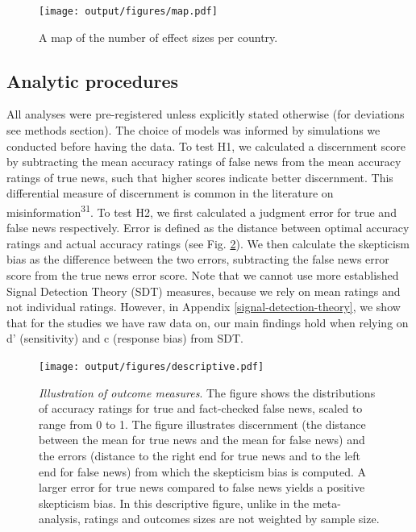 \documentclass[
  man]{apa6}
\begin{document}
\begin{figure}
\centering
\texttt{[image: output/figures/map.pdf]}
\caption{\label{fig:map}A map of the number of effect sizes per country.}
\end{figure}

\subsection{Analytic procedures}\label{analytic-procedures}

All analyses were pre-registered unless explicitly stated otherwise (for deviations see methods section). The choice of models was informed by simulations we conducted before having the data. To test H1, we calculated a discernment score by subtracting the mean accuracy ratings of false news from the mean accuracy ratings of true news, such that higher scores indicate better discernment. This differential measure of discernment is common in the literature on misinformation\textsuperscript{31}. To test H2, we first calculated a judgment error for true and false news respectively. Error is defined as the distance between optimal accuracy ratings and actual accuracy ratings (see Fig. \ref{fig:descriptive}). We then calculate the skepticism bias as the difference between the two errors, subtracting the false news error score from the true news error score. Note that we cannot use more established Signal Detection Theory (SDT) measures, because we rely on mean ratings and not individual ratings. However, in Appendix \ref{signal-detection-theory}, we show that for the studies we have raw data on, our main findings hold when relying on d' (sensitivity) and c (response bias) from SDT.



\begin{figure}
\centering
\texttt{[image: output/figures/descriptive.pdf]}
\caption{\label{fig:descriptive}\emph{Illustration of outcome measures}. The figure shows the distributions of accuracy ratings for true and fact-checked false news, scaled to range from 0 to 1. The figure illustrates discernment (the distance between the mean for true news and the mean for false news) and the errors (distance to the right end for true news and to the left end for false news) from which the skepticism bias is computed. A larger error for true news compared to false news yields a positive skepticism bias. In this descriptive figure, unlike in the meta-analysis, ratings and outcomes sizes are not weighted by sample size.}
\end{figure}
\end{document}
